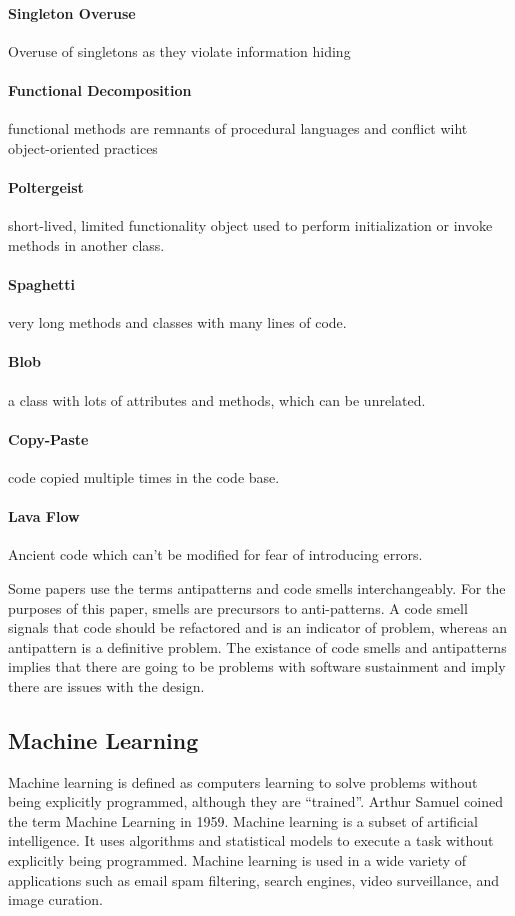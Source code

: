 \documentclass[conference]{IEEEtran}
\begin{document}
\paragraph{Singleton Overuse} Overuse of singletons as they violate information hiding
\paragraph{Functional Decomposition} functional methods are remnants of procedural languages and conflict wiht object-oriented practices
\paragraph{Poltergeist} short-lived, limited functionality object used to perform initialization or invoke methods in another class.
\paragraph{Spaghetti} very long methods and classes with many lines of code.
\paragraph{Blob} a class with lots of attributes and methods, which can be unrelated.
\paragraph{Copy-Paste} code copied multiple times in the code base.
\paragraph{Lava Flow} Ancient code which can't be modified for fear of introducing errors.

Some papers use the terms antipatterns and code smells interchangeably\cite{singh_systematic_2018}. 
For the purposes of this paper, smells are precursors to anti-patterns. 
A code smell signals that code should be refactored and is an indicator of problem, whereas an antipattern is a definitive problem. 
The existance of code smells and antipatterns implies that there are going to be problems with software sustainment and imply there are issues with the design.


\subsection{Machine Learning}
Machine learning is defined as computers learning to solve problems without being explicitly programmed, although they are ``trained''\cite{bishop_pattern_2006}. 
Arthur Samuel coined the term Machine Learning in 1959\cite{samuel_studies_1988}.
Machine learning is a subset of artificial intelligence. 
It uses algorithms and statistical models to execute a task without explicitly being programmed.
Machine learning is used in a wide variety of applications such as email spam filtering, search engines, video surveillance, and image curation.
\end{document}
